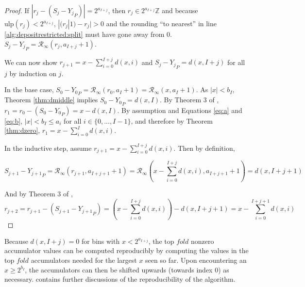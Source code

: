 \documentclass[12pt]{article}
\providecommand{\Z}{\ensuremath{\mathbb{Z}}}
\providecommand{\ulp}{\ensuremath{\text{ulp}}}
\providecommand{\roundtonearestinfty}{\ensuremath{\mathcal{R}_\text{$\infty$}}}
\theoremstyle{definition}
\numberwithin{equation}{section}
\begin{document}
\begin{proof}
        If $|r_j - (S_j - {Y_j}_P)| = 2^{a_{I + j}}$, then $r_j \in 2^{a_{I + j}}\Z$ and because $\ulp(r_j) < 2^{a_{I + j}}$, $|(r_j | 1) - r_j| > 0$ and the rounding ``to nearest'' in line \ref{alg:depositrestricted:split} must have gone away from 0. $S_j - {Y_j}_P = \roundtonearestinfty(r_j, a_{I + j} + 1)$.

        We can now show $r_{j + 1} = x - \sum\limits_{i = 0}^{I + j}d(x, i)$ and $S_j - {Y_j}_P = d(x, I + j)$ for all $j$ by induction on $j$.

        In the base case, $S_0 - {Y_0}_P = \roundtonearestinfty(r_0, a_I + 1) = \roundtonearestinfty(x, a_I + 1)$. As $|x| < b_I$, Theorem \ref{thm:dmiddle} implies $S_0 - {Y_0}_P = d(x, I)$. By Theorem 3 of \cite{repsum}, $r_1 = r_0 - (S_0 - {Y_0}_P) = x - d(x,I)$. By assumption and Equations \ref{eq:a} and \ref{eq:b}, $|x| < b_I \leq a_{i}$ for all $i \in \{0, ..., I - 1\}$, and therefore by Theorem \ref{thm:dzero}, $r_1 = x - \sum\limits_{i = 0}^Id(x, i)$.

        In the inductive step, assume $r_{j + 1} = x - \sum\limits_{i = 0}^{I + j}d(x, i)$. Then by definition,

        \begin{equation*}
          S_{j + 1} - {Y_{j + 1}}_P = \roundtonearestinfty(r_{j + 1}, a_{I + j + 1} + 1) = \roundtonearestinfty(x - \sum\limits_{i = 0}^{I + j}d(x, i), a_{I + j + 1} + 1) = d(x, I + j + 1)
        \end{equation*}

        And by Theorem 3 of \cite{repsum},
        \begin{equation*}
          r_{j + 2} = r_{j + 1} - (S_{j + 1} - {Y_{j + 1}}_P) = (x - \sum\limits_{i = 0}^{I + j}d(x, i)) - d(x, I + j + 1) = x - \sum\limits_{i = 0}^{I + j + 1}d(x, i)
        \end{equation*}
      \end{proof}

      Because $d(x, I + j) = 0$ for bins with $x < 2^{a_{I + j}}$, the top $fold$ nonzero accumulator values can be computed reproducibly by computing the values in the top $fold$ accumulators needed for the largest $x$ seen so far. Upon encountering an $x \geq 2^{b_I}$, the accumulators can then be shifted upwards (towards index $0$) as necessary. \cite{repsum} contains further discussions of the reproducibility of the algorithm.
\end{document}
